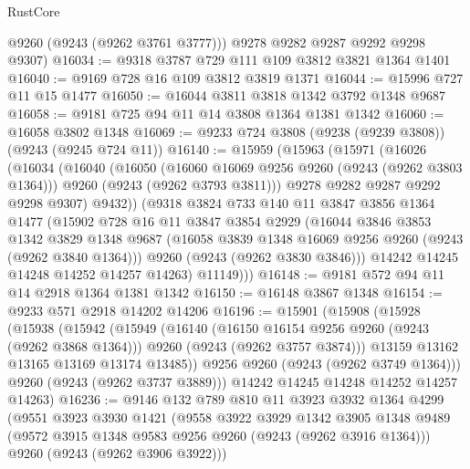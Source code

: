 \begin{lexlean}{RustCore}
\begin{coremodule}
        @9260
        (@9243 (@9262 @3761 @3777)))
      @9278
      @9282
      @9287
      @9292
      @9298
      @9307)
@16034 := @9318 @3787 @729 @111 @109 @3812 @3821 @1364 @1401
@16040 := @9169 @728 @16 @109 @3812 @3819 @1371
@16044 := @15996 @727 @11 @15 @1477
@16050 := @16044 @3811 @3818 @1342 @3792 @1348 @9687
@16058 := @9181 @725 @94 @11 @14 @3808 @1364 @1381 @1342
@16060 := @16058 @3802 @1348
@16069 := @9233 @724 @3808 (@9238 (@9239 @3808)) (@9243 (@9245 @724 @11))
@16140 := @15959
    (@15963
      (@15971
        (@16026
          (@16034
            (@16040
              (@16050
                (@16060 @16069 @9256 @9260 (@9243 (@9262 @3803 @1364)))
                @9260
                (@9243 (@9262 @3793 @3811)))
              @9278
              @9282
              @9287
              @9292
              @9298
              @9307)
            @9432))
        (@9318
          @3824
          @733
          @140
          @11
          @3847
          @3856
          @1364
          @1477
          (@15902
            @728
            @16
            @11
            @3847
            @3854
            @2929
            (@16044
              @3846
              @3853
              @1342
              @3829
              @1348
              @9687
              (@16058 @3839 @1348 @16069 @9256 @9260 (@9243 (@9262 @3840 @1364)))
              @9260
              (@9243 (@9262 @3830 @3846)))
            @14242
            @14245
            @14248
            @14252
            @14257
            @14263)
          @11149)))
@16148 := @9181 @572 @94 @11 @14 @2918 @1364 @1381 @1342
@16150 := @16148 @3867 @1348
@16154 := @9233 @571 @2918 @14202 @14206
@16196 := @15901
    (@15908
      (@15928
        (@15938
          (@15942
            (@15949
              (@16140
                (@16150 @16154 @9256 @9260 (@9243 (@9262 @3868 @1364)))
                @9260
                (@9243 (@9262 @3757 @3874)))
              @13159
              @13162
              @13165
              @13169
              @13174
              @13485))
          @9256
          @9260
          (@9243 (@9262 @3749 @1364)))
        @9260
        (@9243 (@9262 @3737 @3889)))
      @14242
      @14245
      @14248
      @14252
      @14257
      @14263)
@16236 := @9146
    @132
    @789
    @810
    @11
    @3923
    @3932
    @1364
    @4299
    (@9551
      @3923
      @3930
      @1421
      (@9558
        @3922
        @3929
        @1342
        @3905
        @1348
        @9489
        (@9572 @3915 @1348 @9583 @9256 @9260 (@9243 (@9262 @3916 @1364)))
        @9260
        (@9243 (@9262 @3906 @3922)))

\end{coremodule}
\end{lexlean}
